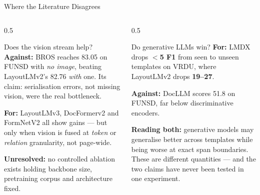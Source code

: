 \documentclass[aspectratio=169, 11pt]{beamer}
\newcommand{\gap}[1]{{\color{warn}\textbf{#1}}}
\begin{document}
\begin{frame}{Where the Literature Disagrees}
  \begin{columns}[T]
    \begin{column}{0.5\textwidth}
      \begin{block}{Does the vision stream help?}
        \small
        \textbf{Against:} BROS reaches 83.05 on FUNSD with \emph{no image}, beating
        LayoutLMv2's 82.76 \emph{with} one. Its claim: serialisation errors, not missing
        vision, were the real bottleneck.
        \smallskip

        \textbf{For:} LayoutLMv3, DocFormerv2 and FormNetV2 all show gains — but only when
        vision is fused at \emph{token} or \emph{relation} granularity, not page-wide.
        \smallskip

        \textbf{Unresolved:} no controlled ablation exists holding backbone size, pretraining
        corpus and architecture fixed.
      \end{block}
    \end{column}
    \begin{column}{0.5\textwidth}
      \begin{block}{Do generative LLMs win?}
        \small
        \textbf{For:} LMDX drops \gap{$<$5 F1} from seen to unseen templates on VRDU, where
        LayoutLMv2 drops \gap{19--27}.
        \smallskip

        \textbf{Against:} DocLLM scores 51.8 on FUNSD, far below discriminative encoders.
        \smallskip

        \textbf{Reading both:} generative models may generalise better across templates while
        being worse at exact span boundaries. These are different quantities — and the two
        claims have never been tested in one experiment.
      \end{block}
    \end{column}
  \end{columns}
\end{frame}
\end{document}
